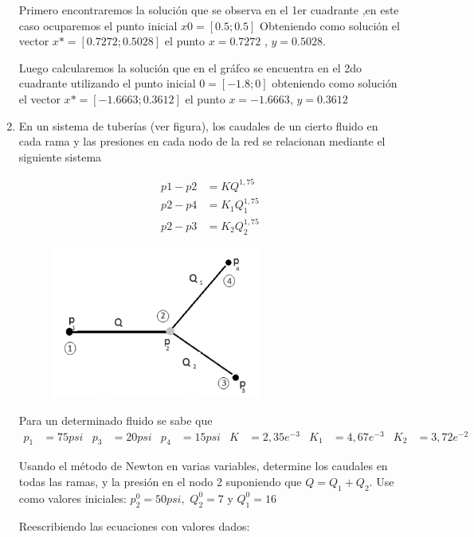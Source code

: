 \documentclass{udparticle}
\begin{document}
\begin{enumerate}
        Primero encontraremos la solución que se observa en el 1er cuadrante ,en este caso ocuparemos el punto inicial $x0 = [0.5;0.5]$ Obteniendo como solución el vector
        $ x*=[0.7272;0.5028] $ el punto $ x = 0.7272 $ , $ y = 0.5028$.
        
        Luego calcularemos la solución que en el gráfco se encuentra en el 2do cuadrante utilizando el punto inicial $0=[-1.8;0]$
        obteniendo como solución el vector $x*=[-1.6663;0.3612]$ el punto  $x=-1.6663$, $y=0.3612$

    
        \newpage
        
        \item En un sistema de tuberías (ver figura), los caudales de un cierto fluido en cada rama y las presiones en cada nodo de la red se relacionan mediante el siguiente sistema
        
        \begin{align*} 
            p1 - p2 &= KQ^{1,75} \\ 
            p2 - p4 &= K_1 Q_1^{1,75}\\
            p2 - p3 &= K_2 Q_2^{1,75}
        \end{align*}
        
    \begin{figure}[H]
    \centering
    \includegraphics[width=7cm]{imagenEjec}
    \end{figure}        
    
    Para un determinado fluido se sabe que
    \begin{align*}
    p_1&=75psi & p_3&=20psi &  p_4&=15psi & K&=2,35e^{-3} & K_1&=4,67e^{-3} & K_2&=3,72e^{-2}
    \end{align*}
    
    Usando el método de Newton en varias variables, determine los caudales en todas las ramas, y la presión en el nodo 2 suponiendo que $Q = Q_1 + Q_2 $. Use como valores iniciales: $ p_2^0= 50 psi,$  $Q_2^0=7$ y  $Q_1^0=16$
    
    
    Reescribiendo las ecuaciones con valores dados:
    

\end{enumerate}
\end{document}
